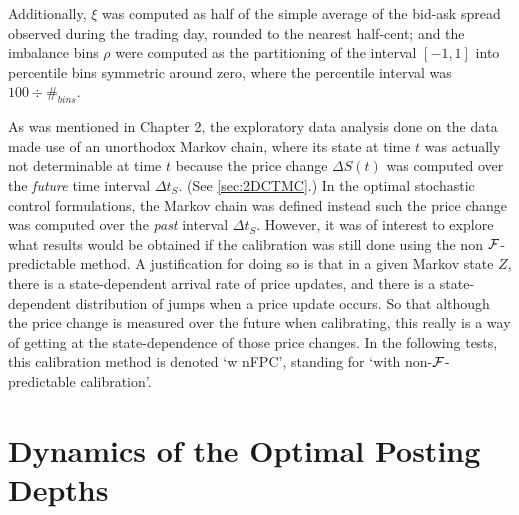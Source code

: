 Additionally, $\xi$ was computed as half of the simple average of the bid-ask spread observed during the trading day, rounded to the nearest half-cent; and the imbalance bins $\rho$ were computed as the partitioning of the interval $[-1,1]$ into percentile bins symmetric around zero, where the percentile interval was $100 \div \#_{bins}$.

As was mentioned in Chapter 2, the exploratory data analysis done on the data made use of an unorthodox Markov chain, where its state at time $t$ was actually not determinable at time $t$ because the price change $\Delta S(t)$ was computed over the \emph{future} time interval $\Delta t_S$. (See \autoref{sec:2DCTMC}.) In the optimal stochastic control formulations, the Markov chain was defined instead such the price change was computed over the \emph{past} interval $\Delta t_S$. However, it was of interest to explore what results would be obtained if the calibration was still done using the non $\mathcal{F}$-predictable method. A justification for doing so is that in a given Markov state $Z$, there is a state-dependent arrival rate of price updates, and there is a state-dependent distribution of jumps when a price update occurs. So that although the price change is measured over the future when calibrating, this really is a way of getting at the state-dependence of those price changes. In the following tests, this calibration method is denoted `w nFPC', standing for `with non-$\mathcal{F}$-predictable calibration'.

\section{Dynamics of the Optimal Posting Depths}


